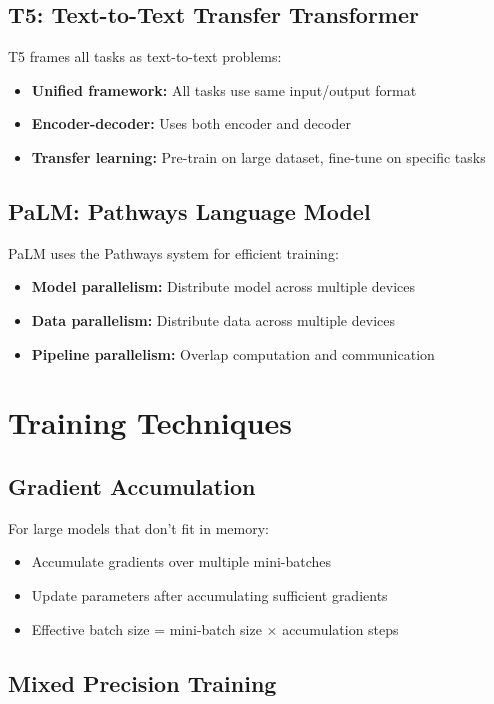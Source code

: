 \subsection{T5: Text-to-Text Transfer Transformer}

T5 frames all tasks as text-to-text problems:
\begin{itemize}
    \item \textbf{Unified framework:} All tasks use same input/output format
    \item \textbf{Encoder-decoder:} Uses both encoder and decoder
    \item \textbf{Transfer learning:} Pre-train on large dataset, fine-tune on specific tasks
\end{itemize}

\subsection{PaLM: Pathways Language Model}

PaLM uses the Pathways system for efficient training:
\begin{itemize}
    \item \textbf{Model parallelism:} Distribute model across multiple devices
    \item \textbf{Data parallelism:} Distribute data across multiple devices
    \item \textbf{Pipeline parallelism:} Overlap computation and communication
\end{itemize}

\section{Training Techniques}

\subsection{Gradient Accumulation}

For large models that don't fit in memory:
\begin{itemize}
    \item Accumulate gradients over multiple mini-batches
    \item Update parameters after accumulating sufficient gradients
    \item Effective batch size = mini-batch size × accumulation steps
\end{itemize}

\subsection{Mixed Precision Training}

